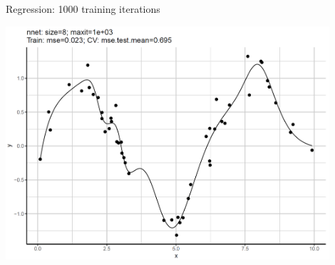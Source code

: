 \begin{frame}{Regression: 1000 training iterations}
{\begin{center}
\includegraphics[width=0.9\textwidth]{plots/reg-n8.png}
\end{center}

}


\end{frame}
